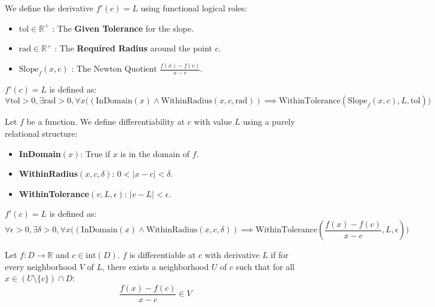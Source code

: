 \begin{definition}
We define the derivative $f'(c) = L$ using functional logical roles:
\begin{itemize}
    \item $\text{tol} \in \mathbb{R}^+$ : The \textbf{Given Tolerance} for the slope.
    \item $\text{rad} \in \mathbb{R}^+$ : The \textbf{Required Radius} around the point $c$.
    \item $\text{Slope}_f(x, c)$ : The Newton Quotient $\frac{f(x)-f(c)}{x-c}$.
\end{itemize}
$f'(c) = L$ is defined as:
\[
\forall \text{tol} > 0, \exists \text{rad} > 0, \forall x \Big( (\text{InDomain}(x) \land \text{WithinRadius}(x, c, \text{rad})) \implies \text{WithinTolerance}(\text{Slope}_f(x, c), L, \text{tol}) \Big)
\]
\end{definition}

\begin{definition}
Let $f$ be a function. We define differentiability at $c$ with value $L$ using a purely relational structure:
\begin{itemize}
    \item \textbf{InDomain}$(x)$: True if $x$ is in the domain of $f$.
    \item \textbf{WithinRadius}$(x, c, \delta)$: $0 < |x - c| < \delta$.
    \item \textbf{WithinTolerance}$(v, L, \epsilon)$: $|v - L| < \epsilon$.
\end{itemize}
$f'(c) = L$ is defined as:
\[
\forall \epsilon > 0, \exists \delta > 0, \forall x \Big( (\text{InDomain}(x) \land \text{WithinRadius}(x, c, \delta)) \implies \text{WithinTolerance}\left( \frac{f(x) - f(c)}{x - c}, L, \epsilon \right) \Big)
\]
\end{definition}









\begin{definition}
Let $f: D \to \mathbb{R}$ and $c \in \text{int}(D)$. $f$ is differentiable at $c$ with derivative $L$ if for every neighborhood $V$ of $L$, there exists a neighborhood $U$ of $c$ such that for all $x \in (U \setminus \{c\}) \cap D$:
\[
\frac{f(x) - f(c)}{x - c} \in V
\]
\end{definition}

